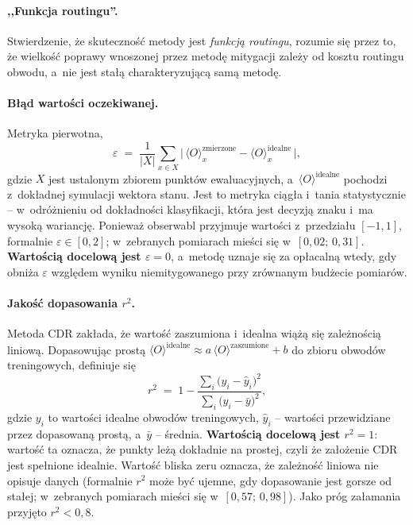 \documentclass[11pt]{article}
\newcommand{\expv}{\langle O\rangle}
\begin{document}
\paragraph{,,Funkcja routingu''.} Stwierdzenie, że skuteczność metody jest \emph{funkcją routingu},
rozumie się przez to, że wielkość poprawy wnoszonej przez metodę mitygacji zależy od kosztu routingu
obwodu, a~nie jest stałą charakteryzującą samą metodę.

\paragraph{Błąd wartości oczekiwanej.} Metryka pierwotna,
\begin{equation}
  \varepsilon \;=\; \frac{1}{|X|}\sum_{x \in X}\bigl|\,\expv_x^{\text{zmierzone}}
  - \expv_x^{\text{idealne}}\,\bigr| ,
  \label{eq:eps}
\end{equation}
gdzie $X$ jest ustalonym zbiorem punktów ewaluacyjnych, a~$\expv^{\text{idealne}}$ pochodzi
z~dokładnej symulacji wektora stanu. Jest to metryka ciągła i~tania statystycznie -- w~odróżnieniu
od dokładności klasyfikacji, która jest decyzją znaku i~ma wysoką wariancję. Ponieważ obserwabl
przyjmuje wartości z~przedziału $[-1,1]$, formalnie $\varepsilon \in [0,2]$; w~zebranych pomiarach
mieści się w~$[0{,}02;\,0{,}31]$. \textbf{Wartością docelową jest $\varepsilon = 0$}, a~metodę uznaje się za
opłacalną wtedy, gdy obniża $\varepsilon$ względem wyniku niemitygowanego przy zrównanym budżecie
pomiarów.

\paragraph{Jakość dopasowania \texorpdfstring{$r^2$}{r2}.} Metoda CDR zakłada, że wartość zaszumiona
i~idealna wiążą się zależnością liniową. Dopasowując prostą $\expv^{\text{idealne}} \approx
a\,\expv^{\text{zaszumione}} + b$ do zbioru obwodów treningowych, definiuje się
\begin{equation}
  r^2 \;=\; 1 - \frac{\sum_i \bigl(y_i - \hat{y}_i\bigr)^2}{\sum_i \bigl(y_i - \bar{y}\bigr)^2},
  \label{eq:r2}
\end{equation}
gdzie $y_i$ to wartości idealne obwodów treningowych, $\hat{y}_i$ -- wartości przewidziane przez
dopasowaną prostą, a~$\bar{y}$ -- średnia. \textbf{Wartością docelową jest $r^2 = 1$}: wartość ta oznacza, że
punkty leżą dokładnie na prostej, czyli że założenie CDR jest spełnione idealnie. Wartość bliska
zeru oznacza, że zależność liniowa nie opisuje danych (formalnie $r^2$ może być ujemne, gdy
dopasowanie jest gorsze od stałej; w~zebranych pomiarach mieści się w~$[0{,}57;\,0{,}98]$). Jako próg
załamania przyjęto $r^2 < 0{,}8$.
\end{document}
